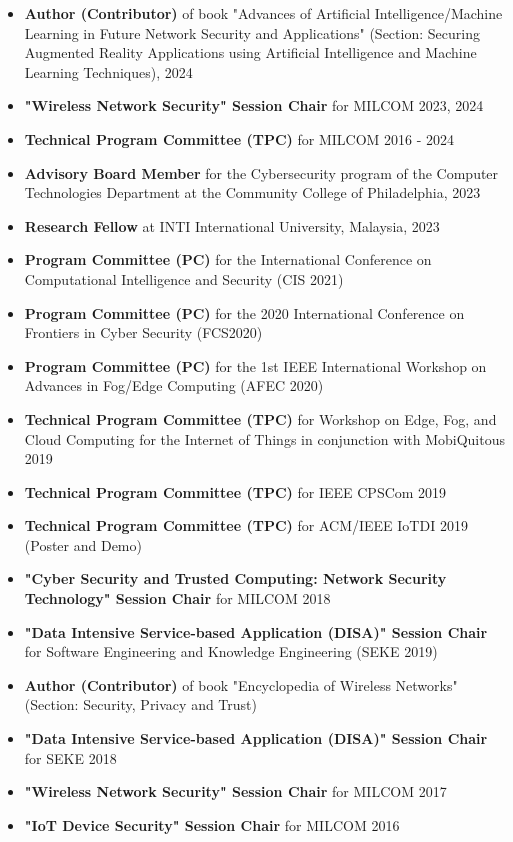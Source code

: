 \documentclass[letter]{article}
\begin{document}
\begin{description}
\begin{itemize}
\item \textbf{Author (Contributor)} of book "Advances of Artificial Intelligence/Machine Learning in Future Network Security and Applications" (Section: Securing Augmented Reality Applications using Artificial Intelligence and Machine Learning Techniques), 2024
\item \textbf{"Wireless Network Security" Session Chair} for MILCOM 2023, 2024
\item \textbf{Technical Program Committee (TPC)} for MILCOM 2016 - 2024
\item \textbf{Advisory Board Member} for the Cybersecurity program of the Computer Technologies Department at the Community College of Philadelphia, 2023
\item \textbf{Research Fellow} at INTI International University, Malaysia, 2023
\item \textbf{Program Committee (PC)} for the International Conference on Computational Intelligence and Security (CIS 2021)
\item \textbf{Program Committee (PC)} for the 2020 International Conference on Frontiers in Cyber Security (FCS2020)
\item \textbf{Program Committee (PC)} for the 1st IEEE International Workshop on Advances in Fog/Edge Computing (AFEC 2020)
\item \textbf{Technical Program Committee (TPC)} for Workshop on Edge, Fog, and Cloud Computing for the Internet of Things in conjunction with MobiQuitous 2019
\item \textbf{Technical Program Committee (TPC)} for IEEE CPSCom 2019
\item \textbf{Technical Program Committee (TPC)} for ACM/IEEE IoTDI 2019 (Poster and Demo)
\item \textbf{"Cyber Security and Trusted Computing: Network Security Technology" Session Chair} for MILCOM 2018
\item \textbf{"Data Intensive Service-based Application (DISA)" Session Chair} for Software Engineering and Knowledge Engineering (SEKE 2019)
\item \textbf{Author (Contributor)} of book "Encyclopedia of Wireless Networks" (Section: Security, Privacy and Trust)
\item \textbf{"Data Intensive Service-based Application (DISA)" Session Chair} for SEKE 2018
\item \textbf{"Wireless Network Security" Session Chair} for MILCOM 2017
\item \textbf{"IoT Device Security" Session Chair} for MILCOM 2016

\end{itemize}
\end{description}
\end{document}
